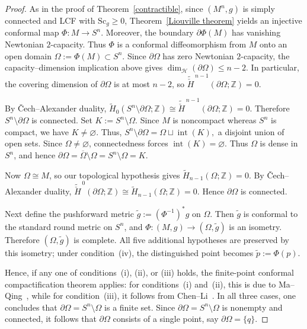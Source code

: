 \documentclass[12pt,oneside,a4paper]{article}
\theoremstyle{mytheorem}
\theoremstyle{remark}
\theoremstyle{definition}
\begin{document}
\begin{proof}
As in the proof of Theorem~\ref{contractible}, since $(M^n,g)$ is simply connected and LCF with $\mathrm{Sc}_g \ge 0$, Theorem~\ref{Liouville theorem} yields an injective conformal map $\Phi\colon M\to S^n$. Moreover, the boundary $\partial \Phi(M)$ has vanishing Newtonian $2$-capacity.
Thus \(\Phi\) is a conformal diffeomorphism from \(M\) onto an open
domain $\Omega:=\Phi(M)\subset S^n.$ Since \(\partial\Omega\) has zero Newtonian \(2\)-capacity, the capacity--dimension implication above gives
$\dim_{\mathcal H}(\partial\Omega)\le n-2.$ In particular, the covering dimension of \(\partial\Omega\) is at most \(n-2\), so
$\widetilde{\check H}^{\,n-1}(\partial\Omega;\mathbb Z)=0.$

By \v{C}ech--Alexander duality,
\(\widetilde H_0(S^n\setminus \partial\Omega;\mathbb Z)
\cong
\widetilde{\check H}^{\,n-1}(\partial\Omega;\mathbb Z)=0\).
Therefore \(S^n\setminus \partial\Omega\) is connected.
Set $K:=S^n\setminus \Omega.$
Since \(M\) is noncompact whereas \(S^n\) is compact, we have \(K\neq\varnothing\). Thus,
$S^n\setminus \partial\Omega=\Omega\sqcup \operatorname{int}(K),$
a disjoint union of open sets. Since \(\Omega\neq\varnothing\), connectedness forces
$\operatorname{int}(K)=\varnothing.$
Thus \(\Omega\) is dense in \(S^n\), and hence
\(\partial\Omega=\overline{\Omega}\setminus\Omega=S^n\setminus\Omega=K.\)

Now \(\Omega\cong M\), so our topological hypothesis gives
$\widetilde H_{n-1}(\Omega;\mathbb Z)=0.$ By \v{C}ech--Alexander duality,
\(\widetilde{\check H}^{\,0}(\partial\Omega;\mathbb Z)
\cong
\widetilde H_{n-1}(\Omega;\mathbb Z)=0\).
Hence \(\partial\Omega\) is connected.

Next define the pushforward metric
$\widetilde g:=(\Phi^{-1})^*g$
on \(\Omega\). Then \(\widetilde g\) is conformal to the standard round metric
on \(S^n\), and \(\Phi\colon(M,g)\to(\Omega,\widetilde g)\)
is an isometry. Therefore \((\Omega,\widetilde g)\) is complete. All five
additional hypotheses are preserved by this isometry; under condition~(iv),
the distinguished point becomes \(\widetilde p:=\Phi(p)\).

Hence, if any one of conditions~(i), (ii), or (iii) holds, the finite-point conformal compactification theorem applies: for conditions~(i) and~(ii), this is due to Ma--Qing~\cite[Corollary~1.1]{zbMATH07456625}, while for condition~(iii), it follows from Chen--Li~\cite[Theorem~1.4]{zbMATH07576884}. In all three cases, one concludes that $\partial \Omega = S^n \setminus \Omega$ is a finite set. Since \(\partial\Omega=S^n\setminus\Omega\) is nonempty and connected, it follows that \(\partial\Omega\) consists of a single point, say \(\partial\Omega=\{q\}\).


\end{proof}
\end{document}
